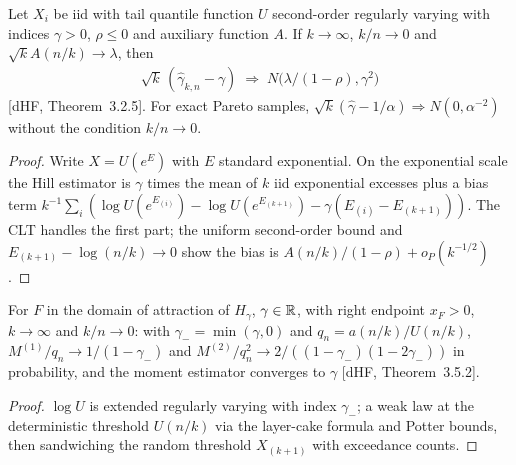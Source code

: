 \begin{theorem}
  \label{thm:hill-normality}
  \leanok
  Let $X_i$ be iid with tail quantile function $U$ second-order regularly varying with indices
  $\gamma > 0$, $\rho \le 0$ and auxiliary function $A$. If $k \to \infty$, $k/n \to 0$ and
  $\sqrt k A(n/k) \to \lambda$, then
  \begin{align*}
    \sqrt k \, (\hat\gamma_{k,n} - \gamma) \; \Rightarrow \; N\big(\lambda/(1 - \rho), \gamma^2\big)
  \end{align*}
  [dHF, Theorem~3.2.5]. For exact Pareto samples, $\sqrt k(\hat\gamma - 1/\alpha) \Rightarrow
  N(0, \alpha^{-2})$ without the condition $k/n \to 0$.
\end{theorem}
\begin{proof}
  \leanok
  Write $X = U(e^E)$ with $E$ standard exponential. On the exponential scale the Hill estimator is
  $\gamma$ times the mean of $k$ iid exponential excesses plus a bias term
  $k^{-1}\sum_i (\log U(e^{E_{(i)}}) - \log U(e^{E_{(k+1)}}) - \gamma(E_{(i)} - E_{(k+1)}))$. The CLT
  handles the first part; the uniform second-order bound and $E_{(k+1)} - \log(n/k) \to 0$ show the
  bias is $A(n/k)/(1-\rho) + o_P(k^{-1/2})$.
\end{proof}

\begin{theorem}
  \label{thm:moment-general}
  \leanok
  For $F$ in the domain of attraction of $H_\gamma$, $\gamma \in \mathbb{R}$, with right endpoint $x_F > 0$,
  $k \to \infty$ and $k/n \to 0$: with $\gamma_- = \min(\gamma, 0)$ and $q_n = a(n/k)/U(n/k)$,
  $M^{(1)}/q_n \to 1/(1 - \gamma_-)$ and $M^{(2)}/q_n^2 \to 2/((1-\gamma_-)(1-2\gamma_-))$ in
  probability, and the moment estimator converges to $\gamma$ [dHF, Theorem~3.5.2].
\end{theorem}
\begin{proof}
  \leanok
  $\log U$ is extended regularly varying with index $\gamma_-$; a weak law at the deterministic
  threshold $U(n/k)$ via the layer-cake formula and Potter bounds, then sandwiching the random
  threshold $X_{(k+1)}$ with exceedance counts.
\end{proof}

